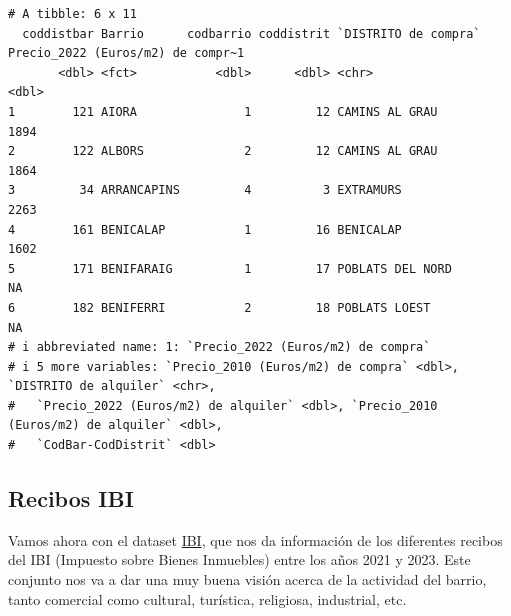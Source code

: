\documentclass[notspecified,article,submit,moreauthors,pdftex]{Definitions/mdpi}
\newenvironment{Shaded}{\begin{snugshade}}{\end{snugshade}}
\newcommand{\AttributeTok}[1]{\textcolor[rgb]{0.13,0.29,0.53}{#1}}
\newcommand{\FunctionTok}[1]{\textcolor[rgb]{0.13,0.29,0.53}{\textbf{#1}}}
\newcommand{\NormalTok}[1]{#1}
\newcommand{\OtherTok}[1]{\textcolor[rgb]{0.56,0.35,0.01}{#1}}
\newcommand{\SpecialCharTok}[1]{\textcolor[rgb]{0.81,0.36,0.00}{\textbf{#1}}}
\newcommand{\StringTok}[1]{\textcolor[rgb]{0.31,0.60,0.02}{#1}}
\begin{document}
\begin{Shaded}
\end{Shaded}

\begin{verbatim}
# A tibble: 6 x 11
  coddistbar Barrio      codbarrio coddistrit `DISTRITO de compra` Precio_2022 (Euros/m2) de compr~1
       <dbl> <fct>           <dbl>      <dbl> <chr>                                            <dbl>
1        121 AIORA               1         12 CAMINS AL GRAU                                    1894
2        122 ALBORS              2         12 CAMINS AL GRAU                                    1864
3         34 ARRANCAPINS         4          3 EXTRAMURS                                         2263
4        161 BENICALAP           1         16 BENICALAP                                         1602
5        171 BENIFARAIG          1         17 POBLATS DEL NORD                                    NA
6        182 BENIFERRI           2         18 POBLATS LOEST                                       NA
# i abbreviated name: 1: `Precio_2022 (Euros/m2) de compra`
# i 5 more variables: `Precio_2010 (Euros/m2) de compra` <dbl>, `DISTRITO de alquiler` <chr>,
#   `Precio_2022 (Euros/m2) de alquiler` <dbl>, `Precio_2010 (Euros/m2) de alquiler` <dbl>,
#   `CodBar-CodDistrit` <dbl>
\end{verbatim}

\hypertarget{recibos-ibi}{%
\subsection{Recibos IBI}\label{recibos-ibi}}

Vamos ahora con el dataset
\href{https://valencia.opendatasoft.com/explore/dataset/rebuts-ibi-2022/table/}{IBI},
que nos da información de los diferentes recibos del IBI (Impuesto sobre
Bienes Inmuebles) entre los años 2021 y 2023. Este conjunto nos va a dar
una muy buena visión acerca de la actividad del barrio, tanto comercial
como cultural, turística, religiosa, industrial, etc.
\end{document}
